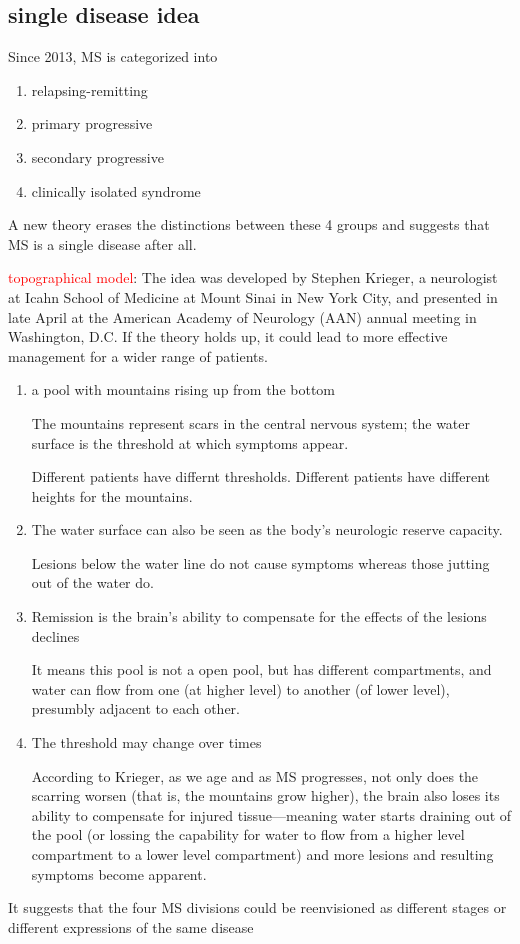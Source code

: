 \subsection{single disease idea}
\label{sec:MS-as-single-disease-hypothesis}

Since 2013, MS is categorized into 
\begin{enumerate}
  \item relapsing-remitting 
  \item primary progressive
  \item secondary progressive
  \item clinically isolated syndrome
\end{enumerate}
A new theory erases the distinctions between these 4 groups and suggests that MS
is a single disease after all.


\textcolor{red}{topographical model}:
The idea was developed by Stephen Krieger, a neurologist at Icahn School of
Medicine at Mount Sinai in New York City, and presented in late April at the
American Academy of Neurology (AAN) annual meeting in Washington, D.C. If the
theory holds up, it could lead to more effective management for a wider range of
patients.
\begin{enumerate}
  
  \item a pool with mountains rising up from the bottom
  
  The mountains represent scars in the central nervous system; the water surface is the threshold at which symptoms appear.
  
  Different patients have differnt thresholds. Different patients have different heights for the mountains.
  
  \item The water surface can also be seen as the body's neurologic reserve capacity.
  
  Lesions below the water line do not cause symptoms whereas those jutting out of the water do.
  
  \item Remission is the brain’s ability to compensate for the effects of the lesions declines
  
  It means this pool is not a open pool, but has different compartments, and
  water can flow from one (at higher level) to another (of lower level),
  presumbly adjacent to each other.
  
  \item The threshold may change over times 
  
  According to Krieger, as we age and as MS progresses, not only does the
  scarring worsen (that is, the mountains grow higher), the brain also loses its
  ability to compensate for injured tissue—meaning water starts draining out of
  the pool (or lossing the capability for water to flow from a higher level
  compartment to a lower level compartment) and more lesions and resulting
  symptoms become apparent.
    
\end{enumerate}
It suggests that the four MS divisions could be reenvisioned as different stages or different expressions of the same disease

